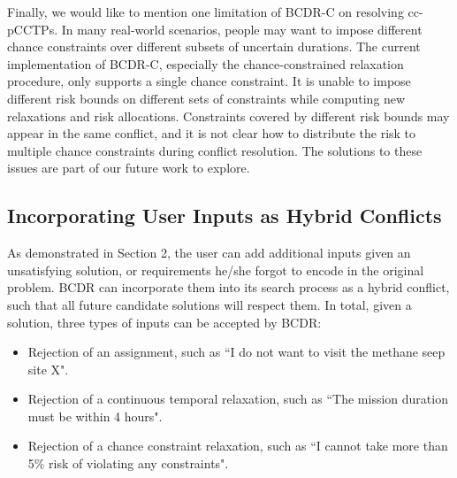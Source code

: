 \documentclass[jair,twoside,11pt,theapa]{article}
\begin{document}


Finally, we would like to mention one limitation of BCDR-C on resolving
cc-pCCTPs. In many real-world scenarios, people may want to impose different chance
constraints over different subsets of uncertain durations. The current
implementation of BCDR-C, especially the chance-constrained relaxation
procedure, only supports a single chance constraint. It is unable to impose
different risk bounds on different sets of constraints while computing new
relaxations and risk allocations. Constraints covered by different risk bounds
may appear in the same conflict, and it is not clear how to distribute the risk
to multiple chance constraints during conflict resolution. The solutions to
these issues are part of our future work to explore.


\subsection{Incorporating User Inputs as Hybrid Conflicts}  


As demonstrated in Section 2, the user can add additional inputs given an
unsatisfying solution, or requirements he/she forgot to encode in the original
problem. BCDR can incorporate them into its search process as a hybrid conflict,
such that all future candidate solutions will respect them. In total, given a
solution, three types of inputs can be accepted by BCDR:

\begin{itemize}
	
	
	\item Rejection of an assignment, such as ``I do not want to visit the methane seep
	site X".
	
	
	\item Rejection of a continuous temporal relaxation, such as ``The mission duration must be
	within 4 hours".
	
	
	\item Rejection of a chance constraint relaxation, such as ``I cannot take more
	than 5\% risk of violating any constraints".
	
\end{itemize}
\end{document}
